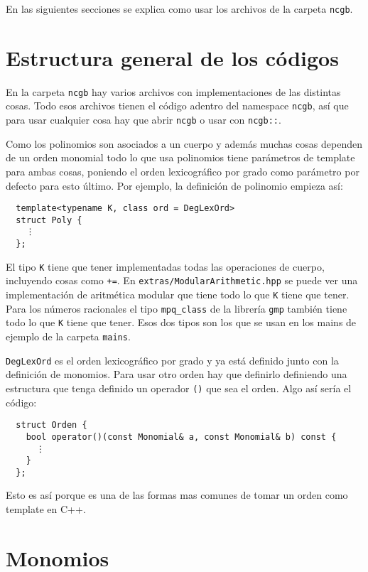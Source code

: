 \documentclass{report}
\theoremstyle{customstyle}
\theoremstyle{factstyle}
\begin{document}
En las siguientes secciones se explica como usar los archivos de la carpeta \texttt{ncgb}.

\section{Estructura general de los códigos}

En la carpeta \texttt{ncgb} hay varios archivos con implementaciones de las distintas cosas. Todo esos archivos tienen el código adentro del namespace \texttt{ncgb}, así que para usar cualquier cosa hay que abrir \texttt{ncgb} o usar con \texttt{ncgb::}.

Como los polinomios son asociados a un cuerpo y además muchas cosas dependen de un orden monomial todo lo que usa polinomios tiene parámetros de template para ambas cosas, poniendo el orden lexicográfico por grado como parámetro por defecto para esto último. Por ejemplo, la definición de polinomio empieza así:

\begin{verbatim}
  template<typename K, class ord = DegLexOrd>
  struct Poly {
    ⋮
  };
\end{verbatim}

El tipo \texttt{K} tiene que tener implementadas todas las operaciones de cuerpo, incluyendo cosas como \texttt{+=}. En \texttt{extras/ModularArithmetic.hpp} se puede ver una implementación de aritmética modular que tiene todo lo que \texttt{K} tiene que tener. Para los números racionales el tipo \texttt{mpq\_class} de la librería \texttt{gmp} también tiene todo lo que \texttt{K} tiene que tener. Esos dos tipos son los que se usan en los mains de ejemplo de la carpeta \texttt{mains}.

\texttt{DegLexOrd} es el orden lexicográfico por grado y ya está definido junto con la definición de monomios. Para usar otro orden hay que definirlo definiendo una estructura que tenga definido un operador \texttt{()} que sea el orden. Algo así sería el código:

\begin{verbatim}
  struct Orden {
    bool operator()(const Monomial& a, const Monomial& b) const {
      ⋮
    }
  };
\end{verbatim}

Esto es así porque es una de las formas mas comunes de tomar un orden como template en C++.

\section{Monomios}
\end{document}
